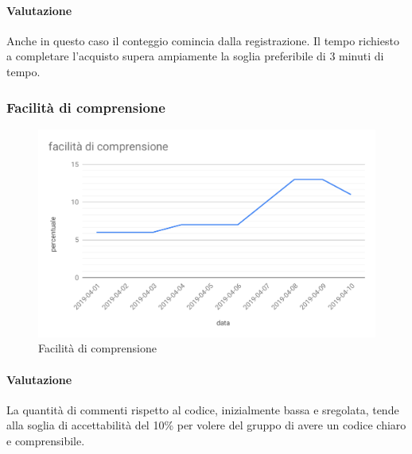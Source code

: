 \paragraph*{Valutazione}
Anche in questo caso il conteggio comincia dalla registrazione. Il tempo richiesto a completare l'acquisto supera ampiamente la soglia preferibile di 3 minuti di tempo. 

\subsubsection{Facilità di comprensione} %
\begin{figure}[H]
	\centering
	\includegraphics[scale=0.6]{res/images/RA/facilita-di-comprensione.pdf}
	\caption{Facilità di comprensione}
\end{figure}
\paragraph*{Valutazione}
La quantità di commenti rispetto al codice, inizialmente bassa e sregolata, tende alla soglia di accettabilità del 10\% per volere del gruppo di avere un codice chiaro e comprensibile. 





